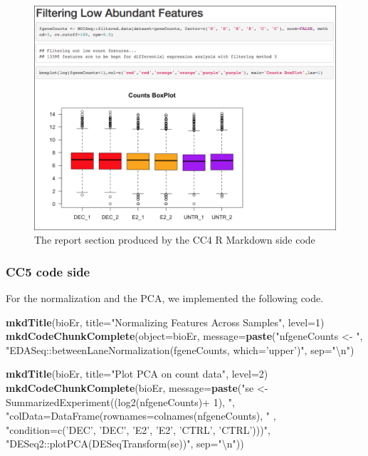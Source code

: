 \documentclass[]{article}
\newenvironment{Shaded}{\begin{snugshade}}{\end{snugshade}}
\newcommand{\CharTok}[1]{\textcolor[rgb]{0.31,0.60,0.02}{#1}}
\newcommand{\DataTypeTok}[1]{\textcolor[rgb]{0.13,0.29,0.53}{#1}}
\newcommand{\DecValTok}[1]{\textcolor[rgb]{0.00,0.00,0.81}{#1}}
\newcommand{\KeywordTok}[1]{\textcolor[rgb]{0.13,0.29,0.53}{\textbf{#1}}}
\newcommand{\NormalTok}[1]{#1}
\newcommand{\StringTok}[1]{\textcolor[rgb]{0.31,0.60,0.02}{#1}}
\begin{document}
\begin{figure}[ht]

{\centering \includegraphics[width=0.9\linewidth]{imgs/4} 

}

\caption{The report section produced by the CC4 R Markdown side code}\label{fig:unnamed-chunk-10}
\end{figure}

\hypertarget{cc5-code-side}{%
\subsubsection{CC5 code side}\label{cc5-code-side}}

For the normalization and the PCA, we implemented the following code.

\begin{Shaded}
\begin{Highlighting}[]
\KeywordTok{mkdTitle}\NormalTok{(bioEr, }\DataTypeTok{title=}\StringTok{"Normalizing Features Across Samples"}\NormalTok{, }\DataTypeTok{level=}\DecValTok{1}\NormalTok{)}
\KeywordTok{mkdCodeChunkComplete}\NormalTok{(}\DataTypeTok{object=}\NormalTok{bioEr, }\DataTypeTok{message=}\KeywordTok{paste}\NormalTok{(}\StringTok{"nfgeneCounts <- "}\NormalTok{,}
              \StringTok{"EDASeq::betweenLaneNormalization(fgeneCounts, which='upper')"}\NormalTok{, }\DataTypeTok{sep=}\StringTok{"}\CharTok{\textbackslash{}n}\StringTok{"}\NormalTok{)}

\KeywordTok{mkdTitle}\NormalTok{(bioEr, }\DataTypeTok{title=}\StringTok{"Plot PCA on count data"}\NormalTok{, }\DataTypeTok{level=}\DecValTok{2}\NormalTok{)}
\KeywordTok{mkdCodeChunkComplete}\NormalTok{(bioEr, }\DataTypeTok{message=}\KeywordTok{paste}\NormalTok{(}\StringTok{"se <- SummarizedExperiment((log2(nfgeneCounts)+ 1), "}\NormalTok{,}
                \StringTok{"colData=DataFrame(rownames=colnames(nfgeneCounts), "}\NormalTok{ ,}
                \StringTok{"condition=c('DEC', 'DEC', 'E2', 'E2', 'CTRL', 'CTRL')))"}\NormalTok{,}
                \StringTok{"DESeq2::plotPCA(DESeqTransform(se))"}\NormalTok{, }\DataTypeTok{sep=}\StringTok{"}\CharTok{\textbackslash{}n}\StringTok{"}\NormalTok{))}
\end{Highlighting}
\end{Shaded}
\end{document}
